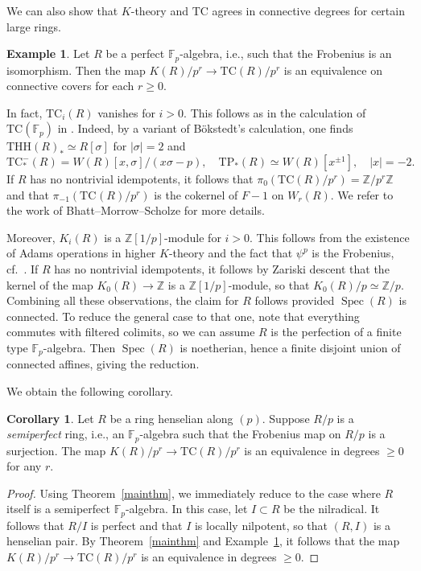 \documentclass{amsart}
\newcommand{\THH}{\mathrm{THH}}
\newcommand{\TP}{\mathrm{TP}}
\theoremstyle{definition}
\newtheorem{example}[definition]{Example}
\newtheorem{corollary}[definition]{Corollary}
\newcommand{\TC}{\mathrm{TC}}
\begin{document}
We can also show that $K$-theory and $\TC$ agrees in connective degrees for
certain large rings. 
\begin{example} 
\label{perfex}
Let $R$ be a perfect $\mathbb{F}_p$-algebra, i.e., such that the Frobenius is
an isomorphism. Then the map $K(R)/p^r \to \TC(R)/p^r$ is an
equivalence on connective covers for each $r \geq 0$.

In fact, 
$\TC_i(R)$ vanishes for $i > 0$. 
This follows as in the calculation of $\TC(\mathbb{F}_p)$ in \cite[Sec.~IV-4]{nikolaus-scholze}. 
Indeed, by a variant of B\"okstedt's calculation, one finds
$\THH(R)_* \simeq R[\sigma]$ for $|\sigma| = 2$ and $$ \TC^-_*(R) =
W(R)[x, \sigma]/(x \sigma - p), \quad \TP_*(R) \simeq W(R)[x^{\pm 1}], \quad
|x| = -2.$$
If $R$ has no nontrivial idempotents, it follows that $\pi_0(\TC(R)/p^r) =
\mathbb{Z}/p^r \mathbb{Z}$
and that $\pi_{-1}(\TC_{}(R)/p^r)$ is the cokernel of $F -1 $ on $W_r(R)$. 
We refer to the work of Bhatt--Morrow--Scholze \cite{BMS2} for more details. 

Moreover, $K_i(R)$ is a $\mathbb{Z}[1/p]$-module for
$i > 0$. This follows from the existence of Adams operations in higher
$K$-theory and the fact that $\psi^p$ is the Frobenius, cf.~\cite{Hiller, Kratzer}. 
If $R$ has  no
nontrivial idempotents, it follows by Zariski descent that the kernel of the map $K_0(R) \to
\mathbb{Z}$ is a $\mathbb{Z}[1/p]$-module, so that $K_0(R)/p \simeq
\mathbb{Z}/p$.  
Combining all these observations, the claim for $R$ follows provided $\operatorname{Spec}(R)$ is connected.  To reduce the general case to that one, note that everything commutes with filtered colimits, so we can assume $R$ is the perfection of a finite type $\mathbb{F}_p$-algebra.  Then $\operatorname{Spec}(R)$ is noetherian, hence a finite disjoint union of connected affines, giving the reduction.
\end{example} 

We obtain the following corollary.
\begin{corollary}
Let $R$ be a ring henselian along $(p)$. 
Suppose $R/p$ is a \emph{semiperfect} ring, i.e., an $\mathbb{F}_p$-algebra 
such that the Frobenius map on $R/p$ is a surjection. 
The map $K(R)/p^r \to \TC(R)/p^r$ is an equivalence in degrees $\geq 0$ for any
$r$. 
\label{Kpfd}
\end{corollary}
\begin{proof} 
Using Theorem~\ref{mainthm}, we immediately reduce to the case where $R$ itself is a
semiperfect $\mathbb{F}_p$-algebra. 
In this case, let $I \subset R$ be the nilradical. It follows that $R/I$ is
perfect and that $I$ is locally nilpotent, so that $(R, I)$ is a henselian pair. 
By Theorem~\ref{mainthm} and Example~\ref{perfex}, it follows that the map
$K(R)/p^r \to \TC(R)/p^r$ is an equivalence in degrees $\geq 0$. 
\end{proof} 
\end{document}
